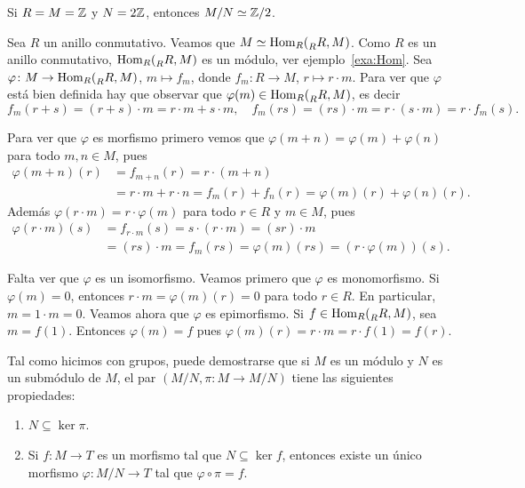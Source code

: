 \begin{example}
Si $R=M=\mathbb{Z}$ y $N=2\mathbb{Z}$, entonces $M/N\simeq\mathbb{Z}/2$. 
\end{example}

\begin{example}
Sea $R$ un anillo conmutativo. Veamos que $M\simeq\operatorname{Hom}_R(\prescript{}{R}R,M)$. 
Como $R$ es un anillo conmutativo, $\operatorname{Hom}_R(\prescript{}{R}R,M)$ es un módulo, ver ejemplo~\ref{exa:Hom}.
Sea $\varphi\colon M\to\operatorname{Hom}_R(\prescript{}{R}R,M)$, $m\mapsto f_m$, donde $f_m\colon R\to M$, $r\mapsto r\cdot m$. Para ver que $\varphi$ está bien definida
hay que observar que $\varphi(m)\in\operatorname{Hom}_R(\prescript{}{R}R,M)$, es decir 
\[
f_m(r+s)=(r+s)\cdot m=r\cdot m+s\cdot m,\quad
f_m(rs)=(rs)\cdot m=r\cdot (s\cdot m)=r\cdot f_m(s).
\]

Para ver que $\varphi$ es morfismo primero vemos que $\varphi(m+n)=\varphi(m)+\varphi(n)$ para todo $m,n\in M$, pues 
\begin{align*}
\varphi(m+n)(r)&=f_{m+n}(r)=r\cdot (m+n)\\
&=r\cdot m+r\cdot n=f_m(r)+f_n(r)=\varphi(m)(r)+\varphi(n)(r).
\end{align*}
Además $\varphi(r\cdot m)=r\cdot\varphi(m)$ para 
todo $r\in R$ y $m\in M$, pues 
\begin{align*}
%
\varphi(r\cdot m)(s)&=f_{r\cdot m}(s)
=s\cdot (r\cdot m)
=(sr)\cdot m\\
&=(rs)\cdot m=f_m(rs)=\varphi(m)(rs)=(r\cdot\varphi(m))(s).
\end{align*}

Falta ver que $\varphi$ es un isomorfismo. 
Veamos primero que $\varphi$ es monomorfismo. Si $\varphi(m)=0$, entonces $r\cdot m=\varphi(m)(r)=0$ para todo $r\in R$. En particular, 
$m=1\cdot m=0$. 	Veamos ahora que $\varphi$ es epimorfismo. Si $f\in\operatorname{Hom}_R(\prescript{}{R}R,M)$, sea $m=f(1)$. Entonces $\varphi(m)=f$ pues
$\varphi(m)(r)=r\cdot m=r\cdot f(1)=f(r)$.
\end{example}

Tal como hicimos con grupos, puede demostrarse que si $M$ es un módulo y $N$ es un submódulo de $M$, el par
$(M/N,\pi\colon M\to M/N)$ tiene las siguientes propiedades:
\begin{enumerate}
\item $N\subseteq \ker \pi$.
\item Si $f\colon M\to T$ es un morfismo tal que $N\subseteq \ker f$, entonces existe un único morfismo $\varphi\colon M/N\to T$ tal que $\varphi\circ\pi =f$.  
\end{enumerate}

